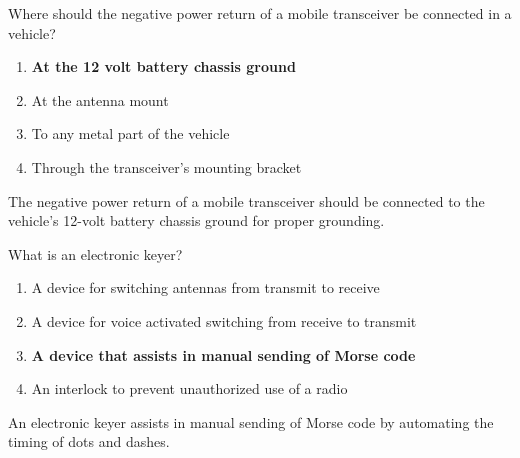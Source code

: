 \begin{tcolorbox}[colback=gray!10!white,colframe=black!75!black,title={T4A11}]
    Where should the negative power return of a mobile transceiver be connected in a vehicle?
    \begin{enumerate}[label=\Alph*),noitemsep]
        \item \textbf{At the 12 volt battery chassis ground}
        \item At the antenna mount
        \item To any metal part of the vehicle
        \item Through the transceiver’s mounting bracket
    \end{enumerate}
\end{tcolorbox}
The negative power return of a mobile transceiver should be connected to the vehicle's 12-volt battery chassis ground for proper grounding.

\begin{tcolorbox}[colback=gray!10!white,colframe=black!75!black,title={T4A12}]
    What is an electronic keyer?
    \begin{enumerate}[label=\Alph*),noitemsep]
        \item A device for switching antennas from transmit to receive
        \item A device for voice activated switching from receive to transmit
        \item \textbf{A device that assists in manual sending of Morse code}
        \item An interlock to prevent unauthorized use of a radio
    \end{enumerate}
\end{tcolorbox}
An electronic keyer assists in manual sending of Morse code by automating the timing of dots and dashes.
